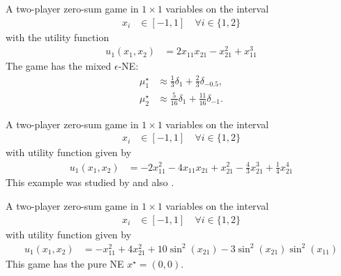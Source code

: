 \begin{game}\label{ex.razaviyayn20.5.3}
A two-player zero-sum game in $1 \times 1$ variables on the interval
\begin{align*}
    x_i &\in [-1,1] \quad \forall i \in \{1,2\}
\end{align*}
with the utility function \cite[Example~3]{razaviyayn.huang.ea:nonconvex}
\begin{align*}
u_{1}\left( x_{1}, x_{2} \right) &= 2 x_{11} x_{21} - x_{21}^{2} + x_{11}^{3}
\end{align*}
The game has the mixed $\epsilon$-NE:
\begin{align*}
\mu_1^\star &\approx \frac{1}{3}\delta_{1} + \frac{2}{3}\delta_{-0.5}, \\
\mu_2^\star &\approx \frac{5}{16}\delta_{1} + \frac{11}{16}\delta_{-1}.
\end{align*}
\end{game}

\begin{game}\label{ex.zheng23.convex.nonconcave}
A two-player zero-sum game in $1 \times 1$ variables on the interval
\begin{align*}
    x_i &\in [-1,1] \quad \forall i \in \{1,2\}
\end{align*}
with utility function given by
\begin{align*}
u_{1}\left( x_{1}, x_{2} \right) &=  - 2 x_{11}^{2} - 4 x_{11} x_{21} + x_{21}^{2} - \frac{4}{3} x_{21}^{3} + \frac{1}{4} x_{21}^{4}
\end{align*}
This example was studied by \textcite[Convex-Nonconcave Example]{zheng.zhu.ea:universal} and also \textcite{Chinchilla2024, pmlr-v89-adolphs19a}.
\end{game}

\begin{game}\label{ex.zheng23.kl.nonconcave}
A two-player zero-sum game in $1 \times 1$ variables on the interval
\begin{align*}
    x_i &\in [-1,1] \quad \forall i \in \{1,2\}
\end{align*}
with utility function \cite[KŁ-Nonconcave Example]{zheng.zhu.ea:universal} given by
\begin{align*}
u_{1}\left( x_{1}, x_{2} \right) &=  - x_{11}^{2} + 4 x_{21}^{2} + 10 \sin^{2}\left( x_{21} \right) - 3 \sin^{2}\left( x_{21} \right) \sin^{2}\left( x_{11} \right)
\end{align*}
This game has the pure NE $x^\star=(0,0)$.
\end{game}

